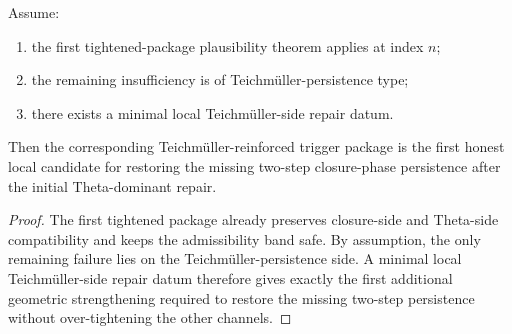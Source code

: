 \begin{lemma}\label{lem:first-local-teichmueller-persistence-repair-lemma}
Assume:
\begin{enumerate}
    \item the first tightened-package plausibility theorem applies at index $n$;
    \item the remaining insufficiency is of Teichm\"uller-persistence type;
    \item there exists a minimal local Teichm\"uller-side repair datum.
\end{enumerate}
Then the corresponding Teichm\"uller-reinforced trigger package is the first honest local candidate for restoring the missing two-step closure-phase persistence after the initial Theta-dominant repair.
\end{lemma}

\begin{proof}
The first tightened package already preserves closure-side and Theta-side compatibility and keeps the admissibility band safe. By assumption, the only remaining failure lies on the Teichm\"uller-persistence side. A minimal local Teichm\"uller-side repair datum therefore gives exactly the first additional geometric strengthening required to restore the missing two-step persistence without over-tightening the other channels.
\end{proof}

